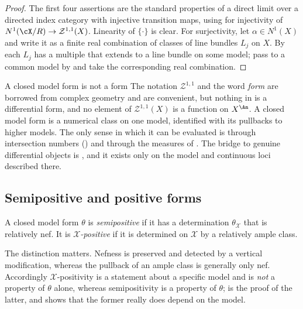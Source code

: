 \begin{proof}
The first four assertions are the standard properties of a direct limit over
a directed index category with injective transition maps, using
 for injectivity of
$N^1(\cX/R)\to\mathcal Z^{1,1}(X)$.  Linearity of $\{\cdot\}$ is clear.  For
surjectivity, let $\alpha\in N^1(X)$ and write it as a finite real
combination of classes of line bundles $L_j$ on $X$.  By
 each $L_j$ has a multiple that extends
to a line bundle on some model; pass to a common model by
 and take the corresponding real combination.
\end{proof}

\noindent\begin{minipage}{\textwidth}
\begin{warning}{A closed model form is not a form}
The notation $\mathcal Z^{1,1}$ and the word \emph{form} are borrowed from
complex geometry and are convenient, but nothing in
 is a differential form, and no element of
$\mathcal Z^{1,1}(X)$ is a function on $X^{\An}$.  A closed model form is a
numerical class on one model, identified with its pullbacks to higher
models.  The only sense in which it can be
evaluated is through intersection numbers
() and through the measures of
.  The bridge to genuine differential objects is
, and it exists only on the model and
continuous loci described there.
\end{warning}
\end{minipage}\par

\subsection{Semipositive and positive forms}
\label{sec:ch20-semipositive-def}

\begin{definition}
\label{def:ch20-semipositive}
A closed model form $\theta$ is \emph{semipositive} if it has a
determination $\theta_{\mathcal X}$ that is relatively nef.  It is
\emph{$\mathcal X$-positive} if it is determined on $\mathcal X$ by a
relatively ample class.
\end{definition}

The distinction matters.  Nefness is preserved and detected by a vertical
modification, whereas the pullback of an ample class is generally only nef.
Accordingly $\mathcal X$-positivity is a statement about a specific model
and is \emph{not} a property of $\theta$ alone, whereas semipositivity is
a property of $\theta$;  is the
proof of the latter, and  shows that the former
really does depend on the model.

